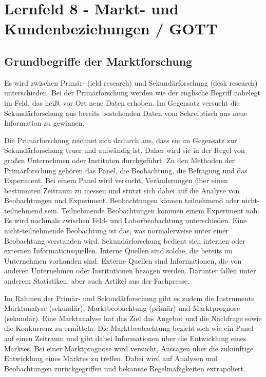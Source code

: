 \section{Lernfeld 8 - Markt- und Kundenbeziehungen / GOTT} %

\subsection{Grundbegriffe der Marktforschung}
Es wird zwischen Primär- (ield research) und Sekundärforschung (desk research) unterschieden. Bei der Primärforschung werden wie der englische Begriff nahelegt im Feld, das heißt vor Ort neue Daten erhoben. Im Gegensatz versucht die Sekundärforschung aus bereits bestehenden Daten vom Schreibtisch aus neue Information zu gewinnen.

\noindent Die Primärforschung zeichnet sich dadurch aus, dass sie im Gegensatz zur Sekundärforschung teuer und aufwändig ist. Daher wird sie in der Regel von großen Unternehmen oder Instituten durchgeführt. Zu den Methoden der Primärforschung gehören das Panel, die Beobachtung, die Befragung und das Experiment. Bei einem Panel wird versucht, Veränderungen über einen bestimmten Zeitraum zu messen und stützt sich dabei auf die Analyse von Beobachtungen und Experiment. Beobachtungen können teilnehmend oder nicht-teilnehmend sein. Teilnehmende Beobachtungen kommen einem Experiment nah. Es wird nochmals zwischen Feld- und Laborbeobachtung unterschieden. Eine nicht-teilnehmende Beobachtung ist das, was normalerweise unter einer Beobachtung verstanden wird. Sekundärforschung bedient sich internen oder externen Informationsquellen. Interne Quellen sind solche, die bereits im Unternehmen vorhanden sind. Externe Quellen sind Informationen, die von anderen Unternehmen oder Institutionen bezogen werden. Darunter fallen unter anderem Statistiken, aber auch Artikel aus der Fachpresse.

Im Rahmen der Primär- und Sekundärforschung gibt es zudem die Instrumente Marktanalyse (sekundär), Marktbeobachtung (primär) und Marktprognose (sekundär). Eine Marktanalyse hat das Ziel das Angebot und die Nachfrage sowie die Konkurrenz zu ermitteln. Die Marktbeobachtung bezieht sich wie ein Panel auf einen Zeitraum und gibt dabei Informationen über die Entwicklung eines Marktes. Bei einer Marktprognose wird versucht, Aussagen über die zukünftige Entwicklung eines Marktes zu treffen. Dabei wird auf Analysen und Beobachtungen zurückgegriffen und bekannte Regelmäßigkeiten extrapoliert.


